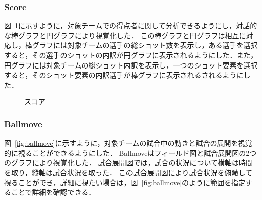 \documentclass[sotsuron]{kuee}
\begin{document}
			\subsubsection{Score}
				図~\ref{fig:score}に示すように，対象チームでの得点者に関して分析できるようにし，対話的な棒グラフと円グラフにより視覚化した．
				この棒グラフと円グラフは相互に対応し，棒グラフには対象チームの選手の総ショット数を表示し，ある選手を選択すると，その選手のショットの内訳が円グラフに表示されるようにした．また，円グラフには対象チームの総ショット内訳を表示し，一つのショット要素を選択すると，そのショット要素の内訳選手が棒グラフに表示されるされるようにした．
					\begin{figure}
						\begin{center}
						\end{center}
						\caption{スコア}
				  		\label{fig:score}
					\end{figure}
			\subsubsection{Ballmove}
				図~\ref{fig:ballmove}に示すように，対象チームの試合中の動きと試合の展開を視覚的に視ることができるようにした．
				Ballmoveはフィールド図と試合展開図の2つのグラフにより視覚化した．
				試合展開図では，試合の状況について横軸は時間を取り，縦軸は試合状況を取った．
				この試合展開図により試合状況を俯瞰して視ることができ，詳細に視たい場合は，図~\ref{fig:ballmove}のように範囲を指定することで詳細を確認できる．
\end{document}
